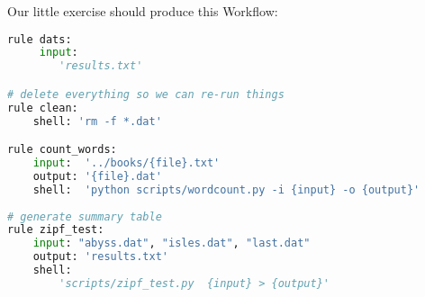 \begin{frame}[fragile]
Our little exercise should produce this Workflow:
      \begin{lstlisting}[language=Python,style=Python, basicstyle=\tiny]
rule dats:
     input:
        'results.txt'

# delete everything so we can re-run things
rule clean:
    shell: 'rm -f *.dat'

rule count_words:
    input:  '../books/{file}.txt'
    output: '{file}.dat'
    shell:  'python scripts/wordcount.py -i {input} -o {output}'
    
# generate summary table
rule zipf_test:
    input: "abyss.dat", "isles.dat", "last.dat"
    output: 'results.txt'
    shell:  
        'scripts/zipf_test.py  {input} > {output}'
      \end{lstlisting}

\end{frame}

